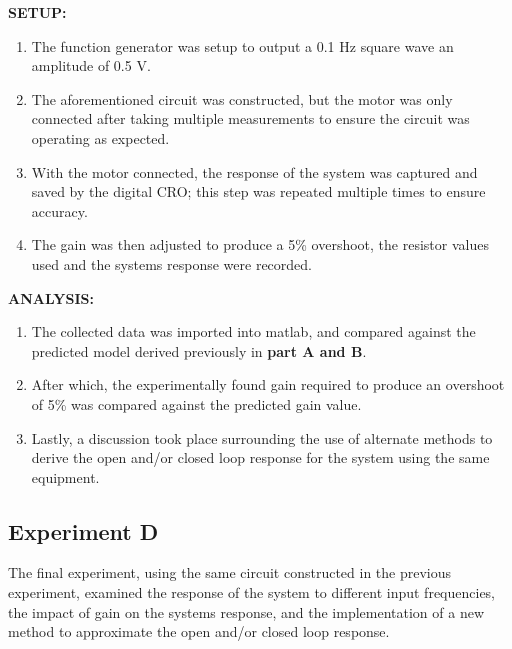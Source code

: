 \documentclass[11pt,a4paper]{article}
\begin{document}
\textbf{SETUP:}
\begin{enumerate}
	\item The function generator was setup to output a 0.1 Hz square wave an amplitude of 0.5 V.
	\item The aforementioned circuit was constructed, but the motor was only connected after taking multiple measurements to ensure the circuit was operating as expected. 
	\item With the motor connected, the response of the system was captured and saved by the digital CRO; this step was repeated multiple times to ensure accuracy.
	\item The gain was then adjusted to produce a 5\% overshoot, the resistor values used and the systems response were recorded.
\end{enumerate} 

\textbf{ANALYSIS:}
\begin{enumerate}
	\item The collected data was imported into matlab, and compared against the predicted model derived previously in \textbf{part A and B}.
	\item After which, the experimentally found gain required to produce an overshoot of 5\% was compared against the predicted gain value. 
	\item Lastly, a discussion took place surrounding the use of alternate methods to derive the open and/or closed loop response for the system using the same equipment.
\end{enumerate}


\pagebreak
\subsection{Experiment D}
The final experiment, using the same circuit constructed in the previous experiment, examined the response of the system to different input frequencies, the impact of gain on the systems response, and the implementation of a new method to approximate the open and/or closed loop response. \\
\end{document}
